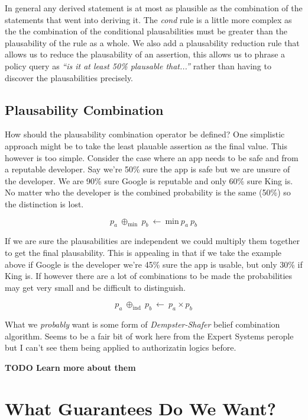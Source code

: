 \documentclass[a4paper]{article}
\begin{document}
In general any derived statement is at most as plausible as the combination of the statements that went into deriving it.  The \emph{cond} rule is a little more complex as the the combination of the conditional plausabilities must be greater than the plausability of the rule as a whole. We also add a plausability reduction rule that allows us to reduce the plausability of an assertion, this allows us to phrase a policy query as \emph{``is it at least 50\% plausable that...''} rather than having to discover the plausabilities precisely.

\subsection{Plausability Combination}

How should the plausability combination operator be defined?
One simplistic approach might be to take the least plauable assertion as the final value.
This however is too simple. Consider the case where an app needs to be safe and from a reputable developer.  Say we're 50\% sure the app is safe but we are unsure of the developer. We are 90\% sure Google is reputable and only 60\% sure King is.  No matter who the developer is the combined probability is the same (50\%) so the distinction is lost.

\begin{equation}
  p_a~\oplus_{\text{min}}~p_b~\gets~\text{min}~p_a~p_b
\end{equation}

If we are sure the plausabilities are independent we could multiply them together to get the final plausability. This is appealing in that if we take the example above if Google is the developer we're 45\% sure the app is usable, but only 30\% if King is.  If however there are a lot of combinations to be made the probabilities may get very small and be difficult to distinguish.

\begin{equation}
  p_a~\oplus_{\text{ind}}~p_b~\gets~p_a\times p_b
\end{equation}

What we \emph{probably} want is some form of \emph{Dempster-Shafer} belief combination algorithm.  Seems to be a fair bit of work here from the Expert Systems perople but I can't see them being applied to authorizatin logics before.

\textbf{TODO Learn more about them}

 
\section{What Guarantees Do We Want?}
\end{document}
